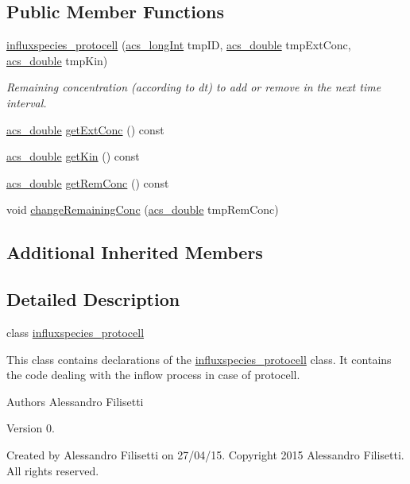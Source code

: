 \subsection*{Public Member Functions}
\begin{DoxyCompactItemize}
\item 
\hyperlink{a00007_a0db73c396ab7d4a61b3c8a79f17d2d88}{influxspecies\-\_\-protocell} (\hyperlink{a00016_a19319d75f02db4308bc5c0026d98cd85}{acs\-\_\-long\-Int} tmp\-I\-D, \hyperlink{a00016_ab776853a005fcbf56af0424a2a4dd607}{acs\-\_\-double} tmp\-Ext\-Conc, \hyperlink{a00016_ab776853a005fcbf56af0424a2a4dd607}{acs\-\_\-double} tmp\-Kin)
\begin{DoxyCompactList}\small\item\em Remaining concentration (according to dt) to add or remove in the next time interval. \end{DoxyCompactList}\item 
\hyperlink{a00016_ab776853a005fcbf56af0424a2a4dd607}{acs\-\_\-double} \hyperlink{a00007_a973ce325110d3baab2794a7f37a0bc3a}{get\-Ext\-Conc} () const 
\item 
\hyperlink{a00016_ab776853a005fcbf56af0424a2a4dd607}{acs\-\_\-double} \hyperlink{a00007_aefa4f5947eab64175f45e72ae658afca}{get\-Kin} () const 
\item 
\hyperlink{a00016_ab776853a005fcbf56af0424a2a4dd607}{acs\-\_\-double} \hyperlink{a00007_a69d83464d8ebc5c52ce6efee8e4c588a}{get\-Rem\-Conc} () const 
\item 
void \hyperlink{a00007_ad092d0a3709e93316dd4325699c34a86}{change\-Remaining\-Conc} (\hyperlink{a00016_ab776853a005fcbf56af0424a2a4dd607}{acs\-\_\-double} tmp\-Rem\-Conc)
\end{DoxyCompactItemize}
\subsection*{Additional Inherited Members}


\subsection{Detailed Description}
class \hyperlink{a00007}{influxspecies\-\_\-protocell} 

This class contains declarations of the \hyperlink{a00007}{influxspecies\-\_\-protocell} class. It contains the code dealing with the inflow process in case of protocell.

\begin{DoxyAuthor}{Authors}
Alessandro Filisetti 
\end{DoxyAuthor}
\begin{DoxyVersion}{Version}
0.
\end{DoxyVersion}
Created by Alessandro Filisetti on 27/04/15. Copyright 2015 Alessandro Filisetti. All rights reserved. 

